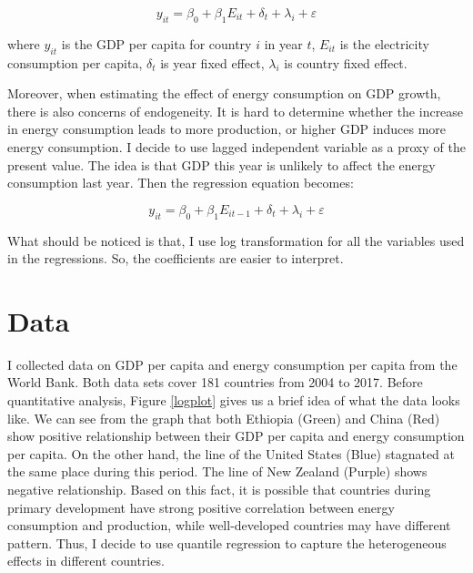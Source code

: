 \documentclass[11pt,letterpaper]{article}
\begin{document}
	\begin{equation}
		y_{it} = \beta_0 + \beta_1 E_{it} + \delta_t + \lambda_i + \varepsilon
 	\end{equation} 
	
	where $y_{it}$ is the GDP per capita for country $i$ in year $t$, $E_{it}$ is the electricity consumption per capita, $\delta_t$ is year fixed effect, $\lambda_i$ is country fixed effect. 
	
	Moreover, when estimating the effect of energy consumption on GDP growth, there is also concerns of endogeneity. It is hard to determine whether the increase in energy consumption leads to more production, or higher GDP induces more energy consumption. I decide to use lagged independent variable as a proxy of the present value. The idea is that GDP this year is unlikely to affect the energy consumption last year. Then the regression equation becomes:
	
	\begin{equation}
		y_{it} = \beta_0 + \beta_1 E_{it-1} + \delta_t + \lambda_i + \varepsilon
	\end{equation}
	
	What should be noticed is that, I use log transformation for all the variables used in the regressions. So, the coefficients are easier to interpret.
	
	\section{Data}
	I collected data on GDP per capita and energy consumption per capita from the World Bank. Both data sets cover 181 countries from 2004 to 2017. Before quantitative analysis, Figure \ref{logplot} gives us a brief idea of what the data looks like. We can see from the graph that both Ethiopia (Green) and China (Red) show positive relationship between their GDP per capita and energy consumption per capita. On the other hand, the line of the United States (Blue) stagnated at the same place during this period. The line of New Zealand (Purple) shows negative relationship. Based on this fact, it is possible that countries during primary development have strong positive correlation between energy consumption and production, while well-developed countries may have different pattern. Thus, I decide to use quantile regression to capture the heterogeneous effects in different countries. 
	
\end{document}
